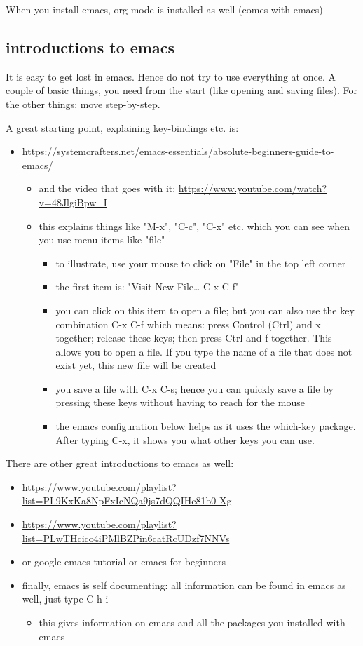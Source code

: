 \documentclass[11pt]{article}
\begin{document}
When you install emacs, org-mode is installed as well (comes with emacs)


\subsection{introductions to emacs}

It is easy to get lost in emacs. Hence do not try to use everything at once. A couple of basic things, you need from the start (like opening and saving files). For the other things: move step-by-step. 

A great starting point, explaining key-bindings etc. is:
\begin{itemize}
\item \url{https://systemcrafters.net/emacs-essentials/absolute-beginners-guide-to-emacs/}
\begin{itemize}
\item and the video that goes with it: \url{https://www.youtube.com/watch?v=48JlgiBpw\_I}
\item this explains things like "M-x", "C-c", "C-x" etc. which you can see when you use menu items like "file"
\begin{itemize}
\item to illustrate, use your mouse to click on "File" in the top left corner
\item the first item is: "Visit New File\ldots{} C-x C-f"
\item you can click on this item to open a file; but you can also use the key combination C-x C-f which means: press Control (Ctrl) and x together; release these keys; then press Ctrl and f together. This allows you to open a file. If you type the name of a file that does not exist yet, this new file will be created
\item you save a file with C-x C-s; hence you can quickly save a file by pressing these keys without having to reach for the mouse
\item the emacs configuration below helps as it uses the which-key package. After typing C-x, it shows you what other keys you can use.
\end{itemize}
\end{itemize}
\end{itemize}

There are other great introductions to emacs as well:
\begin{itemize}
\item \url{https://www.youtube.com/playlist?list=PL9KxKa8NpFxIcNQa9js7dQQIHc81b0-Xg}
\item \url{https://www.youtube.com/playlist?list=PLwTHcico4iPMlBZPin6catRcUDzf7NNVs}
\item or google emacs tutorial or emacs for beginners
\item finally, emacs is self documenting: all information can be found in emacs as well, just type C-h i
\begin{itemize}
\item this gives information on emacs and all the packages you installed with emacs
\end{itemize}
\end{itemize}
\end{document}
